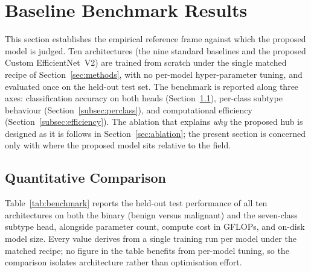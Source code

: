 \section{Baseline Benchmark Results}\label{sec:results}

This section establishes the empirical reference frame against which the
proposed model is judged. Ten architectures (the nine standard baselines and
the proposed Custom EfficientNet~V2) are trained from scratch under the
single matched recipe of Section~\ref{sec:methods}, with no per-model
hyper-parameter tuning, and evaluated once on the held-out test set. The
benchmark is reported along three axes: classification accuracy on both heads
(Section~\ref{subsec:quant}), per-class subtype behaviour
(Section~\ref{subsec:perclass}), and computational efficiency
(Section~\ref{subsec:efficiency}). The ablation that explains \emph{why} the
proposed hub is designed as it is follows in Section~\ref{sec:ablation}; the
present section is concerned only with where the proposed model sits relative
to the field.

\subsection{Quantitative Comparison}\label{subsec:quant}

Table~\ref{tab:benchmark} reports the held-out test performance of all ten
architectures on both the binary (benign versus malignant) and the seven-class
subtype head, alongside parameter count, compute cost in GFLOPs,
and on-disk model size. Every value derives from a single training run per
model under the matched recipe; no figure in the table benefits from per-model
tuning, so the comparison isolates architecture rather than optimisation
effort.

